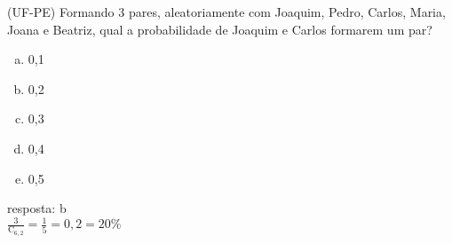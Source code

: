 \begin{ex}
(UF-PE) Formando 3 pares, aleatoriamente com Joaquim, Pedro, Carlos, Maria, Joana e Beatriz, qual a probabilidade de Joaquim e Carlos formarem um par?
   \begin{enumerate}[(a)]
   \item 0,1
   \item 0,2
   \item 0,3
   \item 0,4
   \item 0,5
   \end{enumerate}
     \begin{sol}
       resposta: b \\
       $\frac{3}{\mathrm{C}_{6,2}}=\frac{1}{5}=0,2=20\%$
     \end{sol}
\end{ex}